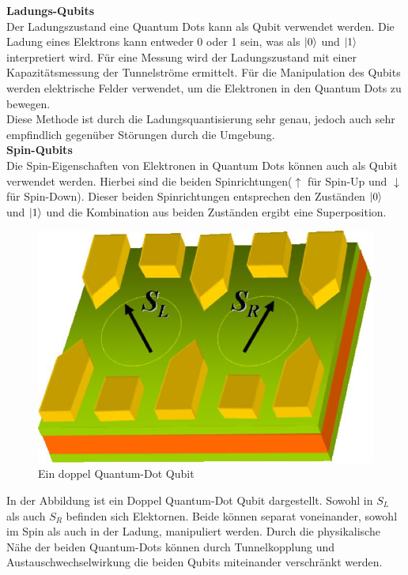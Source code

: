 \textbf{Ladungs-Qubits}\\
Der Ladungszustand eine Quantum Dots kann als Qubit verwendet werden. Die Ladung eines Elektrons kann entweder 0 oder 1 sein, was als $\lvert0\rangle$ und $\lvert1\rangle$ interpretiert wird.
Für eine Messung wird der Ladungszustand mit einer Kapazitätsmessung der Tunnelströme ermittelt.
Für die Manipulation des Qubits werden elektrische Felder verwendet, um die Elektronen in den Quantum Dots zu bewegen.\\

Diese Methode ist durch die Ladungsquantisierung sehr genau, jedoch auch sehr empfindlich gegenüber Störungen durch die Umgebung.\\

\textbf{Spin-Qubits}\\
Die Spin-Eigenschaften von Elektronen in Quantum Dots können auch als Qubit verwendet werden. Hierbei sind die beiden Spinrichtungen($\uparrow$ für Spin-Up und $\downarrow$ für Spin-Down).
Dieser beiden Spinrichtungen entsprechen den Zuständen $\lvert0\rangle$ und $\lvert1\rangle$ und die Kombination aus beiden Zuständen ergibt eine Superposition.\\

\begin{figure}[H]
    \centering
    \includegraphics[width=0.75\linewidth]{img/QD.png}
    \caption{Ein doppel Quantum-Dot Qubit}
    \label{fig:double-Quantum-Dot}
\end{figure}

In der Abbildung ist ein Doppel Quantum-Dot Qubit dargestellt. Sowohl in $S_L$ als auch $S_R$ befinden sich Elektornen. Beide können separat voneinander, sowohl im Spin als auch in der Ladung, manipuliert werden.
Durch die physikalische Nähe der beiden Quantum-Dots können durch Tunnelkopplung und Austauschwechselwirkung die beiden Qubits miteinander verschränkt werden.\\

